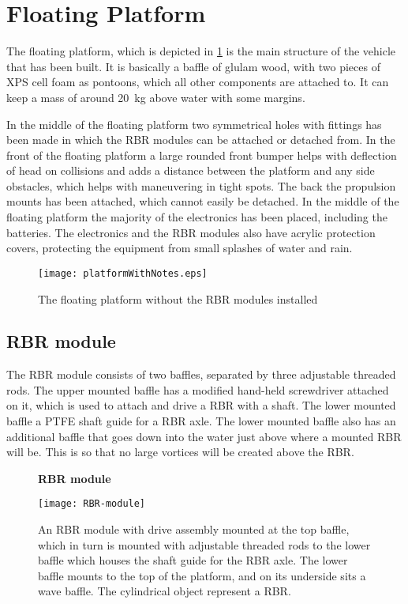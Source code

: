 \section{Floating Platform}
The floating platform, which is depicted in
\cref{fig:floatingPlatform} is the main structure of the vehicle that has been built.
It is basically a baffle of glulam wood, with two pieces of XPS cell foam as
pontoons, which all other components are attached to. It can keep a mass of
around 20~kg above water with some margins.

In the middle of the floating platform two symmetrical holes with fittings has
been made in which the RBR modules can be attached or detached from. In the
front of the floating platform a large rounded front bumper helps with
deflection of head on collisions and adds a distance between the platform and
any side obstacles, which helps with maneuvering in tight spots. The back the
propulsion mounts has been attached, which cannot easily be detached. In the
middle of the floating platform the majority of the electronics has been placed,
including the batteries. The electronics and the RBR modules also have acrylic
protection covers, protecting the equipment from small splashes of water and
rain.
\begin{figure}[h]
   \centering
   \texttt{[image: platformWithNotes.eps]}
   \caption{The floating platform without the RBR modules installed}
   \label{fig:floatingPlatform}
\end{figure}           

\subsection{RBR module}
The RBR module consists of two baffles, separated by three adjustable threaded
rods. The upper mounted baffle has a modified hand-held screwdriver attached on
it, which is used to attach and drive a RBR with a shaft. The lower mounted
baffle a PTFE shaft guide for a RBR axle. The lower mounted baffle also has an
additional baffle that goes down into the water just above where a mounted RBR
will be. This is so that no large vortices will be created above the RBR.

\begin{figure}[H]
  \centering
  \textbf{RBR module}
  \par\medskip
  \texttt{[image: RBR-module]}
  \caption{An RBR module with drive assembly mounted at the top baffle,
    which in turn is mounted with adjustable threaded rods to the lower baffle
    which houses the shaft guide for the RBR axle. The lower baffle mounts to the
    top of the platform, and on its underside sits a wave baffle. The cylindrical object
  represent a RBR.}\label{fig:rbr-module}
\end{figure}

